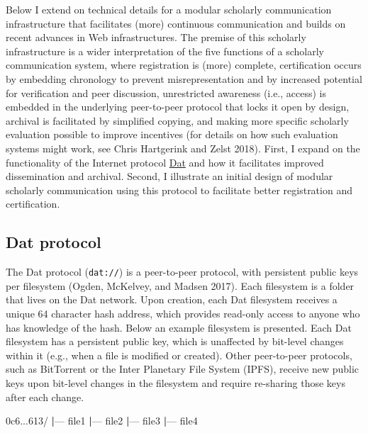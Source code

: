 \documentclass[a4paper]{article}
\newenvironment{Shaded}{\begin{snugshade}}{\end{snugshade}}
\newcommand{\ExtensionTok}[1]{#1}
\newcommand{\KeywordTok}[1]{\textcolor[rgb]{0.13,0.29,0.53}{\textbf{#1}}}
\newcommand{\NormalTok}[1]{#1}
\begin{document}
Below I extend on technical details for a modular scholarly
communication infrastructure that facilitates (more) continuous
communication and builds on recent advances in Web infrastructures. The
premise of this scholarly infrastructure is a wider interpretation of
the five functions of a scholarly communication system, where
registration is (more) complete, certification occurs by embedding
chronology to prevent misrepresentation and by increased potential for
verification and peer discussion, unrestricted awareness (i.e., access)
is embedded in the underlying peer-to-peer protocol that locks it open
by design, archival is facilitated by simplified copying, and making
more specific scholarly evaluation possible to improve incentives (for
details on how such evaluation systems might work, see Chris Hartgerink
and Zelst 2018). First, I expand on the functionality of the Internet
protocol \href{https://datproject.org}{Dat} and how it facilitates
improved dissemination and archival. Second, I illustrate an initial
design of modular scholarly communication using this protocol to
facilitate better registration and certification.

\hypertarget{dat-protocol}{%
\subsection{Dat protocol}\label{dat-protocol}}

The Dat protocol (\texttt{dat://}) is a peer-to-peer protocol, with
persistent public keys per filesystem (Ogden, McKelvey, and Madsen
2017). Each filesystem is a folder that lives on the Dat network. Upon
creation, each Dat filesystem receives a unique 64 character hash
address, which provides read-only access to anyone who has knowledge of
the hash. Below an example filesystem is presented. Each Dat filesystem
has a persistent public key, which is unaffected by bit-level changes
within it (e.g., when a file is modified or created). Other peer-to-peer
protocols, such as BitTorrent or the Inter Planetary File System (IPFS),
receive new public keys upon bit-level changes in the filesystem and
require re-sharing those keys after each change.

\begin{Shaded}
\begin{Highlighting}[]
\ExtensionTok{0c6...613/}
\KeywordTok{|}\ExtensionTok{---}\NormalTok{ file1}
\KeywordTok{|}\ExtensionTok{---}\NormalTok{ file2}
\KeywordTok{|}\ExtensionTok{---}\NormalTok{ file3}
\KeywordTok{|}\ExtensionTok{---}\NormalTok{ file4}
\end{Highlighting}
\end{Shaded}
\end{document}
